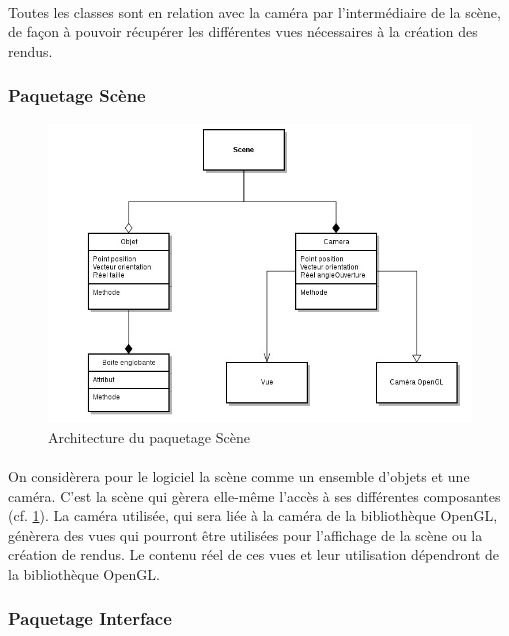 \paragraph{}
Toutes les classes sont en relation avec la caméra par l’intermédiaire de la scène, de façon à pouvoir récupérer les différentes vues nécessaires à la création des rendus.

\newpage

\subsubsection{Paquetage Scène}

\begin{figure}[h]
		\centering
		\includegraphics[scale=0.4]{paquetage_scene.jpg}
		\caption{\label{fig:paqScene} Architecture du paquetage Scène}
\end{figure}

\paragraph{}
On considèrera pour le logiciel la scène comme un ensemble d’objets et une caméra. C’est la scène qui gèrera elle-même l’accès à ses différentes composantes (cf. \ref{fig:paqScene}). La caméra utilisée, qui sera liée à la caméra de la bibliothèque OpenGL, génèrera des vues qui pourront être utilisées pour l’affichage de la scène ou la création de rendus. Le contenu réel de ces vues et leur utilisation dépendront de la bibliothèque OpenGL.

\subsubsection{Paquetage Interface}

